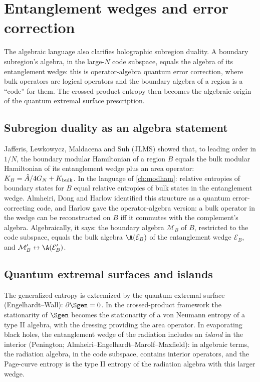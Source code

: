 \chapter{Entanglement wedges and error correction}\label{ch:ew_qec}
\skippable

\begin{physmotiv}
The algebraic language also clarifies holographic subregion duality. A boundary subregion's algebra, in the large-$N$ code subspace, equals the algebra of its entanglement wedge: this is operator-algebra quantum error correction, where bulk operators are logical operators and the boundary algebra of a region is a ``code'' for them. The crossed-product entropy then becomes the algebraic origin of the quantum extremal surface prescription.
\end{physmotiv}

\section{Subregion duality as an algebra statement}

Jafferis, Lewkowycz, Maldacena and Suh (JLMS) showed that, to leading order in $1/N$, the boundary modular Hamiltonian of a region $B$ equals the bulk modular Hamiltonian of its entanglement wedge plus an area operator: $K_B=\hat A/4G_N+K_{\rm bulk}$. In the language of \cref{ch:modham}: relative entropies of boundary states for $B$ equal relative entropies of bulk states in the entanglement wedge. Almheiri, Dong and Harlow identified this structure as a quantum error-correcting code, and Harlow gave the operator-algebra version: a bulk operator in the wedge can be reconstructed on $B$ iff it commutes with the complement's algebra. Algebraically, it says: the boundary algebra $\mathcal M_B$ of $B$, restricted to the code subspace, equals the bulk algebra $\A(\mathcal E_B)$ of the entanglement wedge $\mathcal E_B$, and $\mathcal M_B'\leftrightarrow\A(\mathcal E_B')$.

\section{Quantum extremal surfaces and islands}

The generalized entropy is extremized by the quantum extremal surface (Engelhardt--Wall): $\partial\Sgen=0$. In the crossed-product framework \cite{CPW2022,JSS2023} the stationarity of $\Sgen$ becomes the stationarity of a von Neumann entropy of a type II algebra, with the dressing providing the area operator. In evaporating black holes, the entanglement wedge of the radiation includes an \emph{island} in the interior (Penington; Almheiri--Engelhardt--Marolf--Maxfield): in algebraic terms, the radiation algebra, in the code subspace, contains interior operators, and the Page-curve entropy is the type II entropy of the radiation algebra with this larger wedge.

